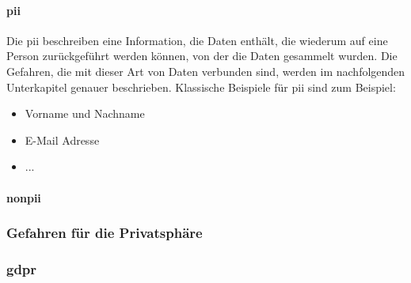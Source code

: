 \paragraph{\acf{pii}}
\label{sec:Einleitung:ssec:Grundlagen:sssec:Klassifikation von Daten:para:PII}
Die \ac{pii} beschreiben eine Information, die Daten enthält, die wiederum auf eine Person zurückgeführt werden können, von der die Daten gesammelt wurden. Die Gefahren, die mit dieser Art von Daten verbunden sind, werden im nachfolgenden Unterkapitel genauer beschrieben. Klassische Beispiele für \acs{pii} sind zum Beispiel:
\begin{itemize}
\item Vorname und Nachname
\item E-Mail Adresse
\item ...
\end{itemize}

\paragraph{\acf{nonpii}}
\label{sec:Einleitung:ssec:Grundlagen:sssec:Klassifikation von Daten:para:Non-PII}

\subsubsection{Gefahren für die Privatsphäre}
\label{sec:Einleitung:ssec:Grundlagen:sssec:Gefahren für die Privatsphäre}

\subsubsection{\acf{gdpr}}
\label{sec:Einleitung:ssec:Grundlagen:sssec:Klassifikation von Daten:para:GDPR}


